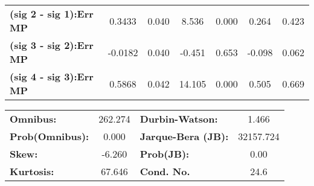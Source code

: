\begin{center}
\begin{tabular}{lcccccc}
\textbf{(sig 2 - sig 1):Err MP} &       0.3433  &        0.040     &     8.536  &         0.000        &        0.264    &        0.423     \\
\textbf{(sig 3 - sig 2):Err MP} &      -0.0182  &        0.040     &    -0.451  &         0.653        &       -0.098    &        0.062     \\
\textbf{(sig 4 - sig 3):Err MP} &       0.5868  &        0.042     &    14.105  &         0.000        &        0.505    &        0.669     \\
\bottomrule
\end{tabular}
\end{center}\begin{center}
\begin{tabular}{lclc}
\toprule
\textbf{Omnibus:}       & 262.274 & \textbf{  Durbin-Watson:     } &     1.466  \\
\textbf{Prob(Omnibus):} &   0.000 & \textbf{  Jarque-Bera (JB):  } & 32157.724  \\
\textbf{Skew:}          &  -6.260 & \textbf{  Prob(JB):          } &      0.00  \\
\textbf{Kurtosis:}      &  67.646 & \textbf{  Cond. No.          } &      24.6  \\
\bottomrule
\end{tabular}
\end{center}
